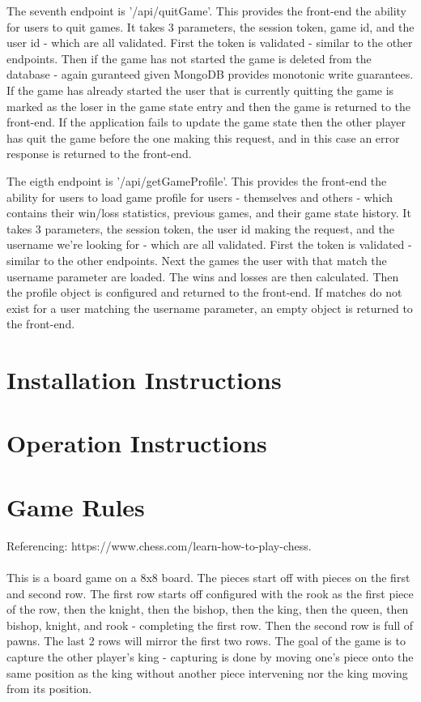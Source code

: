 \documentclass[12pt]{article}
\begin{document}
The seventh endpoint is '/api/quitGame'. This provides the front-end the ability for users to quit games. It takes 3 parameters, the session token, game id, and the user id - which are all validated. First the token is validated - similar to the other endpoints. Then if the game has not started the game is deleted from the database - again guranteed given MongoDB provides monotonic write guarantees. If the game has already started the user that is currently quitting the game is marked as the loser in the game state entry and then the game is returned to the front-end. If the application fails to update the game state then the other player has quit the game before the one making this request, and in this case an error response is returned to the front-end.

The eigth endpoint is '/api/getGameProfile'. This provides the front-end the ability for users to load game profile for users - themselves and others - which contains their win/loss statistics, previous games, and their game state history. It takes 3 parameters, the session token, the user id making the request, and the username we're looking for - which are all validated. First the token is validated - similar to the other endpoints. Next the games the user with that match the username parameter are loaded. The wins and losses are then calculated. Then the profile object is configured and returned to the front-end. If matches do not exist for a user matching the username parameter, an empty object is returned to the front-end.

\section{Installation Instructions}

\section{Operation Instructions}

\section{Game Rules}
Referencing: https://www.chess.com/learn-how-to-play-chess.\\\\
This is a board game on a 8x8 board. The pieces start off with pieces on the first and second row. The first row starts off configured with the rook as the first piece of the row, then the knight, then the bishop, then the king, then the queen, then bishop, knight, and rook - completing the first row. Then the second row is full of pawns. The last 2 rows will mirror the first two rows. The goal of the game is to capture the other player's king - capturing is done by moving one's piece onto the same position as the king without another piece intervening nor the king moving from its position.
\end{document}
